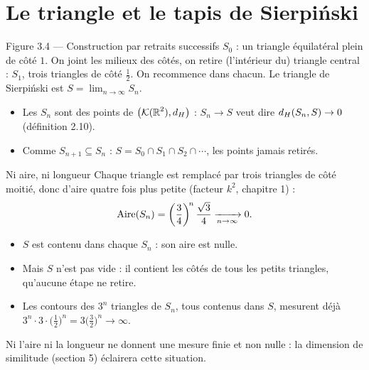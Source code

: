 \section{Le triangle et le tapis de Sierpiński}

\begin{frame}{Figure 3.4 --- Construction par retraits successifs}
  \small $S_0$ : un triangle équilatéral plein de côté $1$. On joint les
  milieux des côtés, on retire (l'intérieur du) triangle central : $S_1$,
  trois triangles de côté $\tfrac12$. On recommence dans chacun.
  \small Le triangle de Sierpiński est $S = \lim_{n\to\infty} S_n$.
  \begin{itemize}
    \item Les $S_n$ sont des points de $\big(\mathcal{K}(\operatorname{\mathbb{R}}^2),d_H\big)$ :
      $S_n\to S$ veut dire $d_H(S_n,S)\to0$ (définition 2.10).
    \item Comme $S_{n+1}\subseteq S_n$ : $S = S_0\cap S_1\cap S_2\cap\cdots$,
      les points jamais retirés.
  \end{itemize}
\end{frame}

\begin{frame}{Ni aire, ni longueur}
  \small Chaque triangle est remplacé par trois triangles de côté moitié,
  donc d'aire quatre fois plus petite (facteur $k^2$, chapitre 1) :
  \[
    \operatorname{Aire}(S_n) = \left(\frac34\right)^{\!n}\frac{\sqrt3}{4}
    \xrightarrow[n\to\infty]{} 0 .
  \]
  \begin{itemize}
    \item $S$ est contenu dans chaque $S_n$ : son aire est nulle.
    \item Mais $S$ n'est pas vide : il contient les côtés de tous les
      petits triangles, qu'aucune étape ne retire.
    \item Les contours des $3^n$ triangles de $S_n$, tous contenus dans
      $S$, mesurent déjà
      $3^n\cdot3\cdot\big(\tfrac12\big)^n = 3\big(\tfrac32\big)^n\to\infty$.
  \end{itemize}
  \vspace{4pt}
  Ni l'aire ni la longueur ne donnent une mesure finie et non nulle :
  la dimension de similitude (section 5) éclairera cette situation.
\end{frame}

